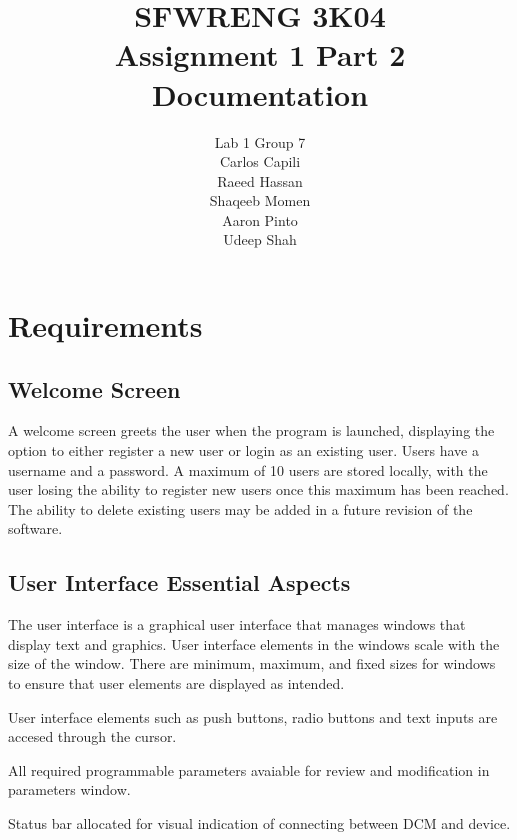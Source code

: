 \documentclass[12pt]{article}
\title{SFWRENG 3K04 \\ Assignment 1 Part 2 \\ Documentation}
\author{
    Lab 1 Group 7 \\
    Carlos Capili \\
    Raeed Hassan \\
    Shaqeeb Momen \\
    Aaron Pinto \\
    Udeep Shah
}
\date{}
\begin{document}
\maketitle \newpage
\tableofcontents \newpage

\section{Requirements}

\subsection{Welcome Screen}
A welcome screen greets the user when the program is launched, displaying the option to either register a new user or login as an existing user. Users have a username and a password. A maximum of 10 users are stored locally, with the user losing the ability to register new users once this maximum has been reached. The ability to delete existing users may be added in a future revision of the software.

\subsection{User Interface Essential Aspects}
The user interface is a graphical user interface that manages windows that display text and graphics. User interface elements in the windows scale with the size of the window. There are minimum, maximum, and fixed sizes for windows to ensure that user elements are displayed as intended.

User interface elements such as push buttons, radio buttons and text inputs are accesed through the cursor.

All required programmable parameters avaiable for review and modification in parameters window.

Status bar allocated for visual indication of connecting between DCM and device.
\end{document}
